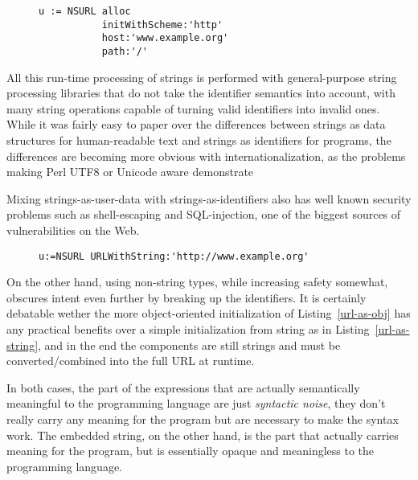 \documentclass[preprint,authoryear]{acm_proc_article-sp}
\begin{document}
\begin{figure}[htbp]
\begin{lstlisting}[style=L,label=url-as-obj,caption=URL initialized in an object-oriented fashion.]
u := NSURL alloc
           initWithScheme:'http'
           host:'www.example.org'
           path:'/' 
\end{lstlisting}
\end{figure}

All this run-time processing of strings is performed with general-purpose string
processing libraries that do not take the identifier semantics into account, with
many string operations capable of turning valid identifiers into invalid ones.
While it was fairly easy to paper over the differences between strings as 
data structures for human-readable text and strings as identifiers for programs,
the differences are becoming more obvious with internationalization, as the
problems making Perl UTF8 or Unicode aware demonstrate \cite{perl-unicode}

Mixing strings-as-user-data with strings-as-identifiers also has well known
security problems such as shell-escaping and SQL-injection, one of the
biggest sources of vulnerabilities on the Web.

\begin{figure}[htbp]
\begin{lstlisting}[style=L,label=url-as-string,caption=URL initialized with a single string.]
u:=NSURL URLWithString:'http://www.example.org'
\end{lstlisting}
\end{figure}



On the other hand, using non-string types, while increasing safety somewhat,
obscures intent even further by breaking up the identifiers.
It is certainly debatable wether the more object-oriented
initialization of Listing~\ref{url-as-obj}  has any practical benefits over a
simple initialization from string as in Listing~\ref{url-as-string}, and in
the end the components are still strings and must be converted/combined
into the full URL at runtime.



In both cases, the part of the expressions that are actually semantically meaningful
to the programming language are just {\em syntactic noise}, they don't really carry
any meaning for the program but are necessary to make the syntax work.  The
embedded string, on the other hand, is the part that actually carries meaning for
the program, but is essentially opaque and meaningless to the programming
language.
\end{document}
